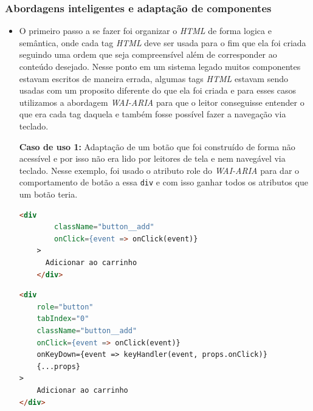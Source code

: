 \subsubsection{Abordagens inteligentes e adaptação de componentes}
{\begin{itemize}
    \item O primeiro passo a se fazer foi organizar o \textit{HTML} de forma logica e semântica, onde cada tag \textit{HTML} deve ser usada para o fim que ela foi criada seguindo uma ordem que seja compreensível além de corresponder ao conteúdo desejado. Nesse ponto em um sistema legado muitos componentes estavam escritos de maneira errada, algumas tags \textit{HTML} estavam sendo usadas com um proposito diferente do que ela foi criada e para esses casos utilizamos a abordagem \textit{WAI-ARIA} para que o leitor conseguisse entender o que era cada tag daquela e também fosse possível fazer a navegação via teclado.

\newpage

{\textbf{Caso de uso 1:} Adaptação de um botão que foi construído de forma não acessível e por isso não era lido por leitores de tela e nem navegável via teclado. Nesse exemplo, foi usado o atributo role do \textit{WAI-ARIA} para dar o comportamento de botão a essa \lstinline{div} e com isso ganhar todos os atributos que um botão teria.

\begin{lstlisting}[language=html, caption=Componente de botão antes de receber boas praticas e acessibilidade]
    <div
        className="button__add"
        onClick={event => onClick(event)}
    >
      Adicionar ao carrinho 
    </div>
\end{lstlisting}}
{\begin{lstlisting}[language=html,caption=Adaptação do componente de botão usando \textit{WAI-ARIA}]
<div 
    role="button" 
    tabIndex="0" 
    className="button__add"
    onClick={event => onClick(event)}
    onKeyDown={event => keyHandler(event, props.onClick)}
    {...props}
>
    Adicionar ao carrinho
</div>
 
\end{lstlisting}}


\end{itemize}}
